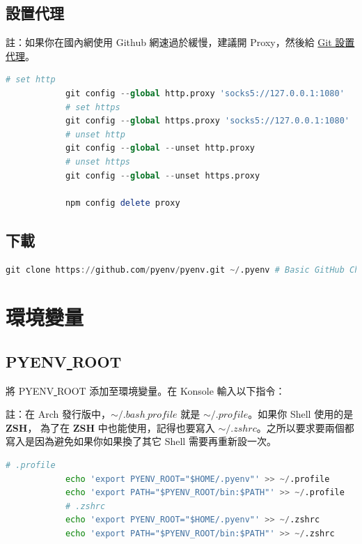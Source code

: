 \documentclass[12pt, a4paper]{article}
\begin{document}
    \subsection{設置代理}
        {\footnotesize 註：如果你在國內網使用 Github 網速過於緩慢，建議開 Proxy，然後給 \href{https://gist.github.com/laispace/666dd7b27e9116faece6}{Git 設置代理}。}

        \begin{lstlisting}[title=Git 設置代理, frame=shadowbox, language=Octave]
            # set http
            git config --global http.proxy 'socks5://127.0.0.1:1080'
            # set https
            git config --global https.proxy 'socks5://127.0.0.1:1080'
            # unset http
            git config --global --unset http.proxy
            # unset https
            git config --global --unset https.proxy

            npm config delete proxy
        \end{lstlisting}
    \subsection{下載}
        \begin{lstlisting}[basicstyle=\tiny\Hack, language=Octave]
            git clone https://github.com/pyenv/pyenv.git ~/.pyenv # Basic GitHub Checkout
        \end{lstlisting}
\section{環境變量}
    \subsection{PYENV\underline{ }ROOT}
        將 PYENV\underline{ }ROOT 添加至環境變量。在 Konsole 輸入以下指令：

        {\footnotesize 註：在 Arch 發行版中，$\sim/.bash\underline{ }profile$ 就是 $\sim/.profile$。如果你 Shell 使用的是 {\bf ZSH}，
        為了在 {\bf ZSH} 中也能使用，記得也要寫入 $\sim/.zshrc$。之所以要求要兩個都寫入是因為避免如果你如果換了其它 Shell 需要再重新設一次。}\\[0.5mm]

        \begin{lstlisting}[language=Octave]
            # .profile
            echo 'export PYENV_ROOT="$HOME/.pyenv"' >> ~/.profile
            echo 'export PATH="$PYENV_ROOT/bin:$PATH"' >> ~/.profile
            # .zshrc
            echo 'export PYENV_ROOT="$HOME/.pyenv"' >> ~/.zshrc
            echo 'export PATH="$PYENV_ROOT/bin:$PATH"' >> ~/.zshrc
        \end{lstlisting}
\end{document}

